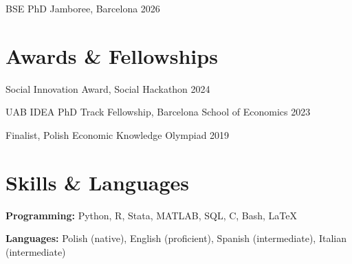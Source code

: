 \documentclass[11pt,a4paper]{article}
\begin{document}
BSE PhD Jamboree, Barcelona \hfill 2026

\section*{Awards \& Fellowships}

Social Innovation Award, Social Hackathon \hfill 2024\par
UAB IDEA PhD Track Fellowship, Barcelona School of Economics \hfill 2023\par
Finalist, Polish Economic Knowledge Olympiad \hfill 2019

\section*{Skills \& Languages}

\textbf{Programming:} Python, R, Stata, MATLAB, SQL, C, Bash, \LaTeX\par
\textbf{Languages:} Polish (native), English (proficient), Spanish (intermediate), Italian (intermediate)
\end{document}
